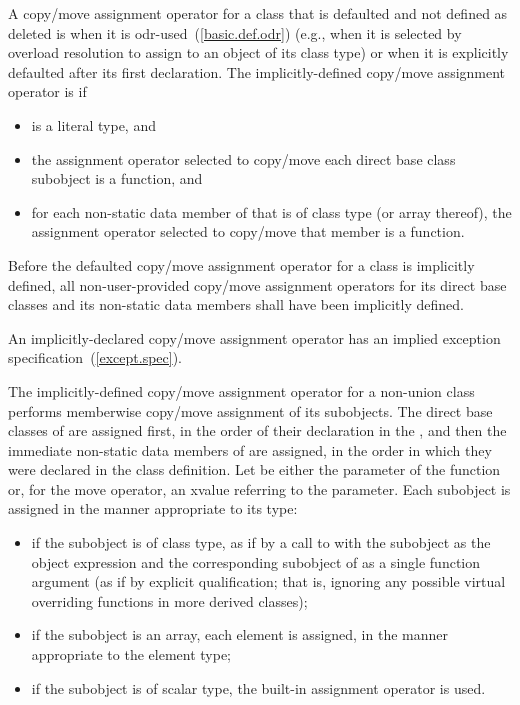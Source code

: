 \pnum
{}%
%
A copy/move assignment operator for a class 
that is defaulted and not defined as deleted
is
when
it is odr-used~(\ref{basic.def.odr}) (e.g., when it is selected by overload resolution
to assign to an object of its class type)
or when it is explicitly defaulted after its first declaration.
The implicitly-defined copy/move assignment operator is  if
\begin{itemize}
\item
{} is a literal type, and

\item
the assignment operator selected to copy/move each direct base class subobject
is a  function, and

\item
for each non-static data member of  that is of class type (or array
thereof), the assignment operator selected to copy/move that member is a
 function.
\end{itemize}

\pnum
Before the defaulted copy/move assignment operator for a class is
implicitly defined,
all non-user-provided copy/move assignment operators for
its direct base classes and
its non-static data members shall have been implicitly defined.
\begin{note}
An implicitly-declared copy/move assignment operator has an
implied exception specification~(\ref{except.spec}).
\end{note}

\pnum
The implicitly-defined copy/move assignment operator for a
non-union class  performs memberwise copy/move assignment of its subobjects. The direct
base classes of  are assigned first, in the order of their declaration in the
, and then the immediate non-static data members of
 are assigned, in the order in which they were declared in the class
definition.
Let  be either the parameter of the function or, for the move operator, an
xvalue referring to the parameter.
Each subobject is assigned in the manner appropriate to its type:

\begin{itemize}
\item
if the subobject is of class type,
as if by a call to  with the subobject as the object expression
and the corresponding subobject of  as a single function argument
(as if by explicit qualification; that is,
ignoring any possible virtual overriding functions in more derived classes);
\item
if the subobject is an array, each element is assigned,
in the manner appropriate to the element type;
\item
if the subobject is of scalar type,
the built-in assignment operator is used.
\end{itemize}

